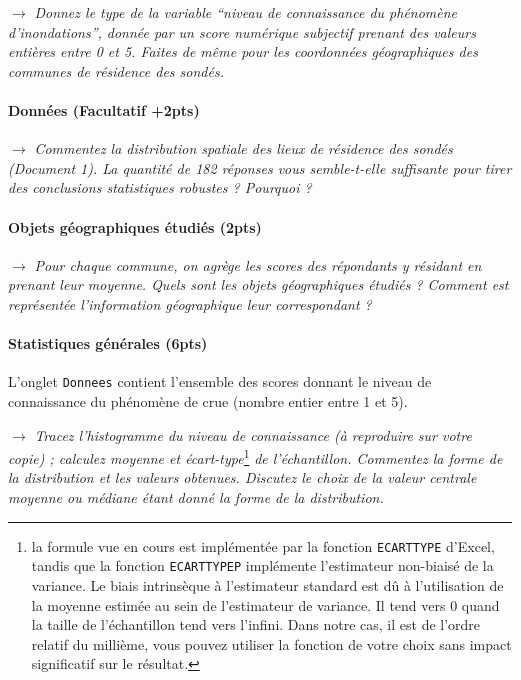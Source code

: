 $\rightarrow$ \textit{Donnez le type de la variable ``niveau de connaissance du phénomène d'inondations'', donnée par un score numérique subjectif prenant des valeurs entières entre 0 et 5. Faites de même pour les coordonnées géographiques des communes de résidence des sondés.}



\paragraph{Données (Facultatif +2pts)}


$\rightarrow$ \textit{Commentez la distribution spatiale des lieux de résidence des sondés (Document 1). La quantité de 182 réponses vous semble-t-elle suffisante pour tirer des conclusions statistiques robustes ? Pourquoi ?}



\paragraph{Objets géographiques étudiés (2pts)}

$\rightarrow$ \textit{Pour chaque commune, on agrège les scores des répondants y résidant en prenant leur moyenne. Quels sont les objets géographiques étudiés ? Comment est représentée l'information géographique leur correspondant ?}





\paragraph{Statistiques générales (6pts)}

L'onglet \texttt{Donnees} contient l'ensemble des scores donnant le niveau de connaissance du phénomène de crue (nombre entier entre 1 et 5).

\medskip

$\rightarrow$ \textit{Tracez l'histogramme du niveau de connaissance (à reproduire sur votre copie) ; calculez moyenne et écart-type}\footnote{la formule vue en cours est implémentée par la fonction \texttt{ECARTTYPE} d'Excel\textregistered, tandis que la fonction \texttt{ECARTTYPEP} implémente l'estimateur non-biaisé de la variance. Le biais intrinsèque à l'estimateur standard est dû à l'utilisation de la moyenne estimée au sein de l'estimateur de variance. Il tend vers 0 quand la taille de l'échantillon tend vers l'infini. Dans notre cas, il est de l'ordre relatif du millième, vous pouvez utiliser la fonction de votre choix sans impact significatif sur le résultat.}\textit{ de l'échantillon. Commentez la forme de la distribution et les valeurs obtenues. Discutez le choix de la valeur centrale moyenne ou médiane étant donné la forme de la distribution.}


